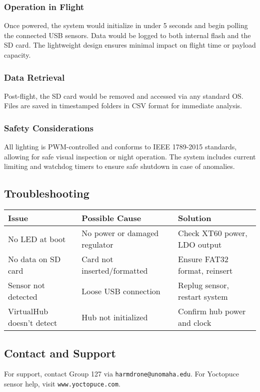 \documentclass[12pt]{article}
\begin{document}
\subsubsection{Operation in Flight}
Once powered, the system would initialize in under 5 seconds and begin polling the connected USB sensors. Data would be logged to both internal flash and the SD card. The lightweight design ensures minimal impact on flight time or payload capacity.

\subsubsection{Data Retrieval}
Post-flight, the SD card would be removed and accessed via any standard OS. Files are saved in timestamped folders in CSV format for immediate analysis.

\subsubsection{Safety Considerations}
All lighting is PWM-controlled and conforms to IEEE 1789-2015 standards, allowing for safe visual inspection or night operation. The system includes current limiting and watchdog timers to ensure safe shutdown in case of anomalies.

\subsection{Troubleshooting}
\begin{tabular}{|l|l|l|}
\hline
\textbf{Issue} & \textbf{Possible Cause} & \textbf{Solution} \\
\hline
No LED at boot & No power or damaged regulator & Check XT60 power, LDO output \\
\hline
No data on SD card & Card not inserted/formatted & Ensure FAT32 format, reinsert \\
\hline
Sensor not detected & Loose USB connection & Replug sensor, restart system \\
\hline
VirtualHub doesn't detect & Hub not initialized & Confirm hub power and clock \\
\hline
\end{tabular}

\subsection{Contact and Support}
For support, contact Group 127 via \texttt{harmdrone@unomaha.edu}. For Yoctopuce sensor help, visit \texttt{www.yoctopuce.com}.
\end{document}
